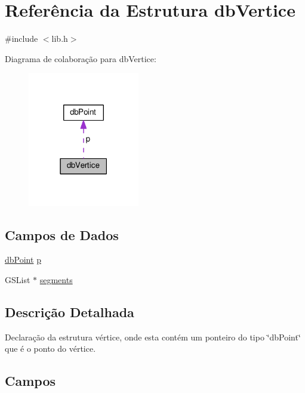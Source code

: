 \hypertarget{structdbVertice}{}\section{Referência da Estrutura db\+Vertice}
\label{structdbVertice}


{\ttfamily \#include $<$lib.\+h$>$}



Diagrama de colaboração para db\+Vertice\+:\nopagebreak
\begin{figure}[H]
\begin{center}
\leavevmode
\includegraphics[width=138pt]{structdbVertice__coll__graph}
\end{center}
\end{figure}
\subsection*{Campos de Dados}
\begin{DoxyCompactItemize}
\item 
\hyperlink{structdbPoint}{db\+Point} \hyperlink{structdbVertice_a03ab875eb2041f01ba2b5b86d413896b}{p}
\item 
G\+S\+List $\ast$ \hyperlink{structdbVertice_a0ae9e8feccea4307d768c5c1463f4d28}{segments}
\end{DoxyCompactItemize}


\subsection{Descrição Detalhada}
Declaração da estrutura vértice, onde esta contém um ponteiro do tipo \char`\"{}db\+Point\char`\"{} que é o ponto do vértice. 

\subsection{Campos}
